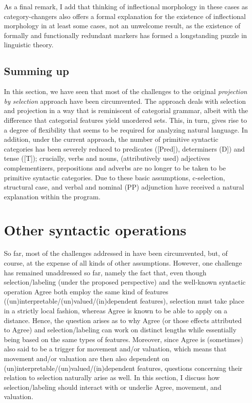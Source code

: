 \documentclass[output=paper
,modfonts
,nonflat]{langsci/langscibook}
\begin{document}
As a final remark, I add that thinking of inflectional morphology in these cases as category-changers also offers a formal explanation for the existence of inflectional morphology in at least some cases, not an unwelcome result, as the existence of formally and functionally redundant markers has formed a longstanding puzzle in linguistic theory.

\subsection{Summing up}
In this section, we have seen that most of the challenges to the original \textit{projection by selection} approach have been circumvented. The approach deals with selection and projection in a way that is reminiscent of categorial grammar, albeit with the difference that categorial features yield unordered sets. This, in turn, gives rise to a degree of flexibility that seems to be required for analyzing natural language. In addition, under the current approach, the number of primitive syntactic categories has been severely reduced to predicates ([Pred]), determiners (D]) and tense ([T]); crucially, verbs and nouns, (attributively used) adjectives complementizers, prepositions and adverbs are no longer to be taken to be primitive syntactic categories. Due to these basic assumptions, c-selection, structural case, and verbal and nominal (PP) adjunction have received a natural explanation within the program.

\section{Other syntactic operations}
So far, most of the challenges addressed in  have been circumvented, but, of course, at the expense of all kinds of other assumptions. However, one challenge has remained unaddressed so far, namely the fact that, even though selection\slash labeling (under the proposed perspective) and the well-known syntactic operation Agree both employ the same kind of features ((un)interpretable\slash (un)valued\slash (in)dependent features), selection must take place in a strictly local fashion, whereas Agree is known to be able to apply on a distance. Hence, the question arises as to why Agree (or those effects attributed to Agree) and selection\slash labeling can work on distinct lengths while essentially being based on the same types of features. Moreover, since Agree is (sometimes) also said to be a trigger for movement and/or valuation, which means that movement and/or valuation are then also dependent on (un)interpretable\slash\relax(un)valued\slash\relax(in)dependent features, questions concerning their relation to selection naturally arise as well. In this section, I discuss how selection\slash labeling should interact with or underlie Agree, movement, and valuation.
\end{document}
